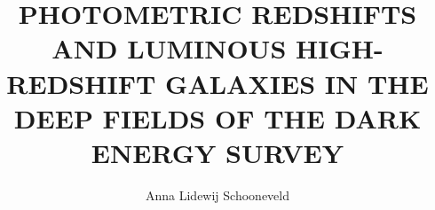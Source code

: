 \title{\uppercase{Photometric Redshifts \\ and Luminous High-Redshift Galaxies in the Deep Fields of the Dark Energy Survey}}

\subtitle{}

\author{Anna Lidewij Schooneveld}








     



